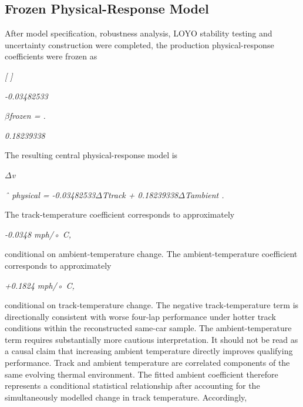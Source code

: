 \subsection{Frozen Physical-Response Model}
After model specification, robustness analysis, LOYO stability testing and uncertainty construction were completed, the production physical-response coefficients were frozen as

\begin{center}\textit{[            ]}\end{center}

\begin{center}\textit{-0.03482533}\end{center}

\begin{center}\textit{\ensuremath{\beta}frozen =                    .}\end{center}

\begin{center}\textit{0.18239338}\end{center}

The resulting central physical-response model is

\begin{center}\textit{\ensuremath{\Delta}v}\end{center}

\begin{center}\textit{ˆ physical = -0.03482533\ensuremath{\Delta}Ttrack + 0.18239338\ensuremath{\Delta}Tambient .}\end{center}

The track-temperature coefficient corresponds to approximately

\begin{center}\textit{-0.0348 mph/◦ C,}\end{center}

conditional on ambient-temperature change. The ambient-temperature coefficient corresponds to approximately

\begin{center}\textit{+0.1824 mph/◦ C,}\end{center}

conditional on track-temperature change. The negative track-temperature term is directionally consistent with worse four-lap performance under hotter track conditions within the reconstructed same-car sample. The ambient-temperature term requires substantially more cautious interpretation. It should not be read as a causal claim that increasing ambient temperature directly improves qualifying performance. Track and ambient temperature are correlated components of the same evolving thermal environment. The fitted ambient coefficient therefore represents a conditional statistical relationship after accounting for the simultaneously modelled change in track temperature. Accordingly,

